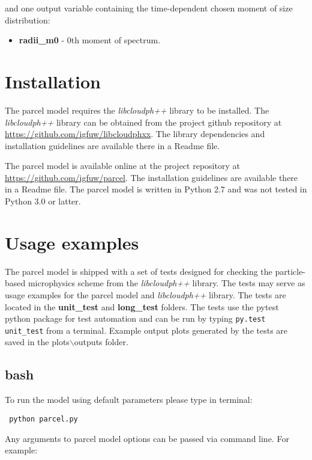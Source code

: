\documentclass[11pt]{article}
\newcommand{\prog}[1]{{\tt#1}}
\begin{document}
and one output variable containing the time-dependent chosen moment of size distribution:
\begin{itemize}
  \item \textbf{radii\_m0} - 0th moment of spectrum.
\end{itemize}

\section{Installation}

The parcel model requires the \emph{libcloudph++} library to be installed. 
The \emph{libcloudph++} library can be obtained from the project github repository 
  at \url{https://github.com/igfuw/libcloudphxx}.
The library dependencies and installation guidelines are available there in a Readme file.

The parcel model is available online at the project repository at \url{https://github.com/igfuw/parcel}.
The installation guidelines are available there in a Readme file.
The parcel model is written in Python 2.7 and was not tested in Python 3.0 or latter.

\section{Usage examples}

The parcel model is shipped with a set of tests designed for checking the particle-based microphysics scheme
  from the \emph{libcloudph++} library.
The tests may serve as usage examples for the parcel model and \emph{libcloudph++} library.
The tests are located in the {\bf unit\_test} and {\bf long\_test} folders.
The tests use the pytest python package for test automation and can be run by typing  \prog{py.test unit\_test} 
  from a terminal.
Example output plots generated by the tests are saved in the plots$\backslash$outputs folder.

\subsection{bash}

\noindent
To run the model using default parameters please type in terminal:

\vspace{0.35cm}
  \prog{ python parcel.py}
\vspace{0.35cm}

\noindent
Any arguments to parcel model options can be passed via command line. For example:
\end{document}
